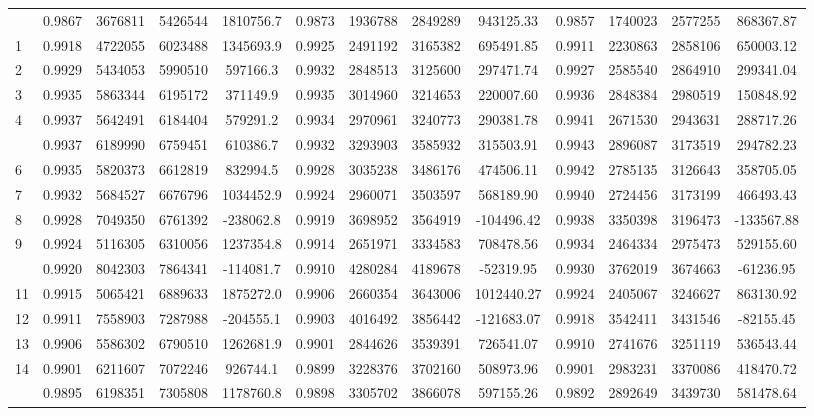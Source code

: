 \documentclass[
  12pt,
]{article}
\begin{document}
\begin{longtable}[t]{lcccccccccccc}
\endfoot
\bottomrule
\endlastfoot
0 & 0.9867 & 3676811 & 5426544 & 1810756.7 & 0.9873 & 1936788 & 2849289 & 943125.33 & 0.9857 & 1740023 & 2577255 & 868367.87\\
1 & 0.9918 & 4722055 & 6023488 & 1345693.9 & 0.9925 & 2491192 & 3165382 & 695491.85 & 0.9911 & 2230863 & 2858106 & 650003.12\\
2 & 0.9929 & 5434053 & 5990510 & 597166.3 & 0.9932 & 2848513 & 3125600 & 297471.74 & 0.9927 & 2585540 & 2864910 & 299341.04\\
3 & 0.9935 & 5863344 & 6195172 & 371149.9 & 0.9935 & 3014960 & 3214653 & 220007.60 & 0.9936 & 2848384 & 2980519 & 150848.92\\
4 & 0.9937 & 5642491 & 6184404 & 579291.2 & 0.9934 & 2970961 & 3240773 & 290381.78 & 0.9941 & 2671530 & 2943631 & 288717.26\\
\addlinespace
5 & 0.9937 & 6189990 & 6759451 & 610386.7 & 0.9932 & 3293903 & 3585932 & 315503.91 & 0.9943 & 2896087 & 3173519 & 294782.23\\
6 & 0.9935 & 5820373 & 6612819 & 832994.5 & 0.9928 & 3035238 & 3486176 & 474506.11 & 0.9942 & 2785135 & 3126643 & 358705.05\\
7 & 0.9932 & 5684527 & 6676796 & 1034452.9 & 0.9924 & 2960071 & 3503597 & 568189.90 & 0.9940 & 2724456 & 3173199 & 466493.43\\
8 & 0.9928 & 7049350 & 6761392 & -238062.8 & 0.9919 & 3698952 & 3564919 & -104496.42 & 0.9938 & 3350398 & 3196473 & -133567.88\\
9 & 0.9924 & 5116305 & 6310056 & 1237354.8 & 0.9914 & 2651971 & 3334583 & 708478.56 & 0.9934 & 2464334 & 2975473 & 529155.60\\
\addlinespace
10 & 0.9920 & 8042303 & 7864341 & -114081.7 & 0.9910 & 4280284 & 4189678 & -52319.95 & 0.9930 & 3762019 & 3674663 & -61236.95\\
11 & 0.9915 & 5065421 & 6889633 & 1875272.0 & 0.9906 & 2660354 & 3643006 & 1012440.27 & 0.9924 & 2405067 & 3246627 & 863130.92\\
12 & 0.9911 & 7558903 & 7287988 & -204555.1 & 0.9903 & 4016492 & 3856442 & -121683.07 & 0.9918 & 3542411 & 3431546 & -82155.45\\
13 & 0.9906 & 5586302 & 6790510 & 1262681.9 & 0.9901 & 2844626 & 3539391 & 726541.07 & 0.9910 & 2741676 & 3251119 & 536543.44\\
14 & 0.9901 & 6211607 & 7072246 & 926744.1 & 0.9899 & 3228376 & 3702160 & 508973.96 & 0.9901 & 2983231 & 3370086 & 418470.72\\
\addlinespace
15 & 0.9895 & 6198351 & 7305808 & 1178760.8 & 0.9898 & 3305702 & 3866078 & 597155.26 & 0.9892 & 2892649 & 3439730 & 581478.64\\

\end{longtable}
\end{document}
